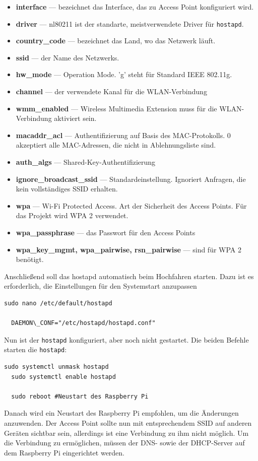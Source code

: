 \documentclass[12pt, letterpaper]{article}
\begin{document}
\begin{itemize}
  \item[\textbullet] \textbf{interface} --- bezeichnet das Interface, das zu Access Point konfiguriert wird.
  \item[\textbullet] \textbf{driver} --- nl80211 ist der standarte, meistverwendete Driver für \texttt{hostapd}.
  \item[\textbullet] \textbf{country\_code} --- bezeichnet das Land, wo das Netzwerk läuft.
  \item[\textbullet] \textbf{ssid} --- der Name des Netzwerks.
  \item[\textbullet] \textbf{hw\_mode}  --- Operation Mode. 'g' steht für Standard IEEE 802.11g.
  \item[\textbullet] \textbf{channel} --- der verwendete Kanal für die WLAN-Verbindung
  \item[\textbullet] \textbf{wmm\_enabled} --- Wireless Multimedia Extension muss für die WLAN-Verbindung aktiviert sein.
  \item[\textbullet] \textbf{macaddr\_acl} --- Authentifizierung auf Basis des MAC-Protokolls. 0 akzeptiert alle MAC-Adressen, die nicht in Ablehnungsliste sind.
  \item[\textbullet] \textbf{auth\_algs} --- Shared-Key-Authentifizierung
  \item[\textbullet] \textbf{ignore\_broadcast\_ssid} --- Standardeinstellung. Ignoriert Anfragen, die kein vollständiges SSID erhalten.
  \item[\textbullet] \textbf{wpa} --- Wi-Fi Protected Access. Art der Sicherheit des Access Points. Für das Projekt wird WPA 2 verwendet.
  \item[\textbullet] \textbf{wpa\_passphrase} --- das Passwort für den Access Points
  \item[\textbullet] \textbf{wpa\_key\_mgmt, wpa\_pairwise, rsn\_pairwise} --- sind für WPA 2 benötigt.
\end{itemize}
\par Anschließend soll das hostapd automatisch beim Hochfahren starten. Dazu ist es erforderlich, die Einstellungen für den Systemstart anzupassen
\begin{Verbatim}[frame=single]
  sudo nano /etc/default/hostapd

  DAEMON\_CONF="/etc/hostapd/hostapd.conf"
\end{Verbatim}
\par Nun ist der \texttt{hostapd} konfiguriert, aber noch nicht gestartet. Die beiden Befehle starten die \texttt{hostapd}:
\begin{Verbatim}[frame=single]
  sudo systemctl unmask hostapd
  sudo systemctl enable hostapd

  sudo reboot #Neustart des Raspberry Pi
\end{Verbatim}
\par Danach wird ein Neustart des Raspberry Pi empfohlen, um die Änderungen anzuwenden. Der Access Point sollte nun mit entsprechendem SSID auf anderen Geräten sichtbar sein, allerdings ist eine Verbindung zu ihm nicht möglich. Um die Verbindung zu ermöglichen, müssen der DNS- sowie der DHCP-Server auf dem Raspberry Pi eingerichtet werden.
\end{document}
